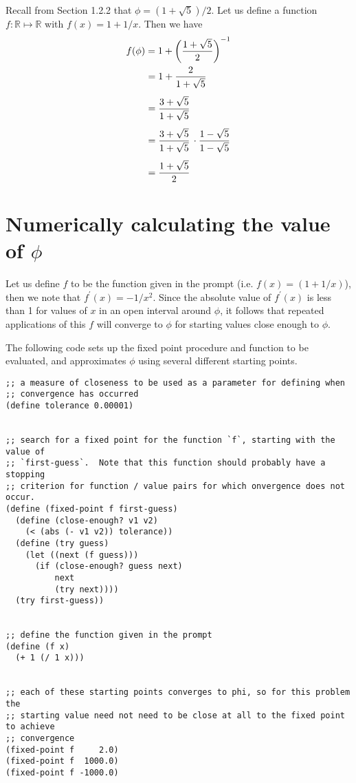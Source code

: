 \documentclass{article}
\begin{document}
\noindent Recall from Section 1.2.2 that $\phi = (1 + \sqrt{5}) / 2$.  Let us
define a function $f: \mathbb{R} \mapsto \mathbb{R}$ with $f(x) = 1 + 1 / x$.
Then we have
\begin{align*} \MoveEqLeft
  f(\phi) = 1 + \left( \frac{1 + \sqrt{5}}{2} \right)^{-1} \\
  &= 1 + \frac{2}{1 + \sqrt{5}} \\[1ex]
  &= \frac{3 + \sqrt{5}}{1 + \sqrt{5}} \\[1ex]
  &= \frac{3 + \sqrt{5}}{1 + \sqrt{5}} \,\cdot \frac{1 - \sqrt{5}}{1 - \sqrt{5}} \\[1ex]
  &= \frac{1 + \sqrt{5}}{2}
\end{align*}




\section{Numerically calculating the value of $\phi$}

Let us define $f$ to be the function given in the prompt (i.e.
$f(x) = (1 + 1/x)$), then we note that $f^{\prime}(x) = -1 / x^2$.  Since the
absolute value of $f^{\prime}(x)$ is less than 1 for values of $x$ in an open
interval around $\phi$, it follows that repeated applications of this $f$ will
converge to $\phi$ for starting values close enough to $\phi$.

The following code sets up the fixed point procedure and function to be
evaluated, and approximates $\phi$ using several different starting points.

\vspace{2mm}
\begin{lstlisting}[style=scheme]
;; a measure of closeness to be used as a parameter for defining when
;; convergence has occurred
(define tolerance 0.00001)


;; search for a fixed point for the function `f`, starting with the value of
;; `first-guess`.  Note that this function should probably have a stopping
;; criterion for function / value pairs for which onvergence does not occur.
(define (fixed-point f first-guess)
  (define (close-enough? v1 v2)
    (< (abs (- v1 v2)) tolerance))
  (define (try guess)
    (let ((next (f guess)))
      (if (close-enough? guess next)
          next
          (try next))))
  (try first-guess))


;; define the function given in the prompt
(define (f x)
  (+ 1 (/ 1 x)))


;; each of these starting points converges to phi, so for this problem the
;; starting value need not need to be close at all to the fixed point to achieve
;; convergence
(fixed-point f     2.0)
(fixed-point f  1000.0)
(fixed-point f -1000.0)
\end{lstlisting}
\end{document}
